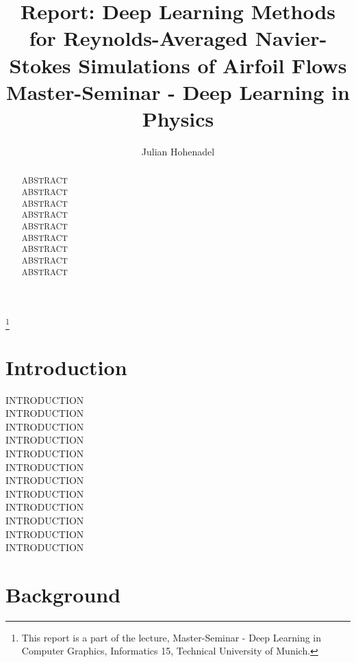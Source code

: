 \documentclass[acmtog]{techreportacmart}
\begin{document}
\title{Report: Deep Learning Methods for Reynolds-Averaged Navier-Stokes Simulations of
Airfoil Flows \\ Master-Seminar - Deep Learning in Physics} 
\author{Julian Hohenadel}

\renewcommand\shortauthors{Hohenadel}

\begin{abstract}
ABSTRACT \\
ABSTRACT \\
ABSTRACT \\
ABSTRACT \\
ABSTRACT \\
ABSTRACT \\
ABSTRACT \\
ABSTRACT \\
ABSTRACT \\
\end{abstract}

%
%



\thanks{This report is a part of the lecture, Master-Seminar - Deep Learning in
  Computer Graphics, Informatics 15, Technical University of Munich.}


\maketitle

\section{Introduction}
INTRODUCTION \\
INTRODUCTION \\
INTRODUCTION \\
INTRODUCTION \\
INTRODUCTION \\
INTRODUCTION \\
INTRODUCTION \\
INTRODUCTION \\
INTRODUCTION \\
INTRODUCTION \\
INTRODUCTION \\
INTRODUCTION \\


\section{Background}
\end{document}
